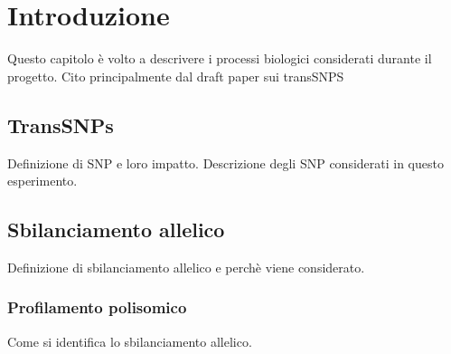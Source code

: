 \chapter{Introduzione}
\label{cha:intro}
Questo capitolo \`e volto a descrivere i processi biologici considerati durante il progetto.
Cito principalmente dal draft paper sui transSNPS

\section{TransSNPs}
\label{sec:transsnps}
Definizione di SNP e loro impatto.
Descrizione degli SNP considerati in questo esperimento.

\section{Sbilanciamento allelico}
\label{sec:allelicimbalance}
Definizione di sbilanciamento allelico e perch\`e viene considerato.

	\subsection{Profilamento polisomico}
	\label{subsec:polysomalprofiling}
	Come si identifica lo sbilanciamento allelico.
